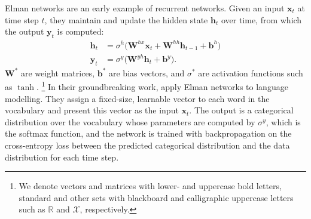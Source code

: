 \documentclass[12pt,a4paper,oneside]{book}
\newcommand{\Rb}{\mathbb{R}}
\newcommand{\vx}{\mathbf{x}}
\newcommand{\vh}{\mathbf{h}}
\newcommand{\vy}{\mathbf{y}}
\newcommand{\vb}{\mathbf{b}}
\newcommand{\mW}{\mathbf{W}}
\newcommand{\cX}{\mathcal{X}}
\begin{document}
Elman networks \citep{elman1990finding} are an early example of recurrent networks.
Given an input $\vx_t$ at time step $t$, they maintain and update the hidden state $\vh_t$ over time, from which the output $\vy_t$ is computed:
\begin{align*}
\vh_t &= \sigma^h\big(\mW^{hx} \vx_t + \mW^{hh} \vh_{t-1} + \vb^h\big)  \\
\vy_t &= \sigma^y\big(\mW^{yh} \vh_t + \vb^y\big).
\end{align*}
$\mW^*$ are weight matrices, $\vb^*$ are bias vectors, and $\sigma^*$ are activation functions such as $\tanh$.
\footnote{We denote vectors and matrices with lower- and uppercase bold letters, standard and other sets with blackboard and calligraphic uppercase letters such as $\Rb$ and $\cX$, respectively.}
In their groundbreaking work, \citet{mikolov2010recurrent} apply Elman networks to language modelling.
They assign a fixed-size, learnable vector to each word in the vocabulary and present this vector as the input $\vx_t$.
The output is a categorical distribution over the vocabulary whose parameters are computed by $\sigma^y$, which is the softmax function, and the network is trained with backpropagation on the cross-entropy loss between the predicted categorical distribution and the data distribution for each time step.
\end{document}
